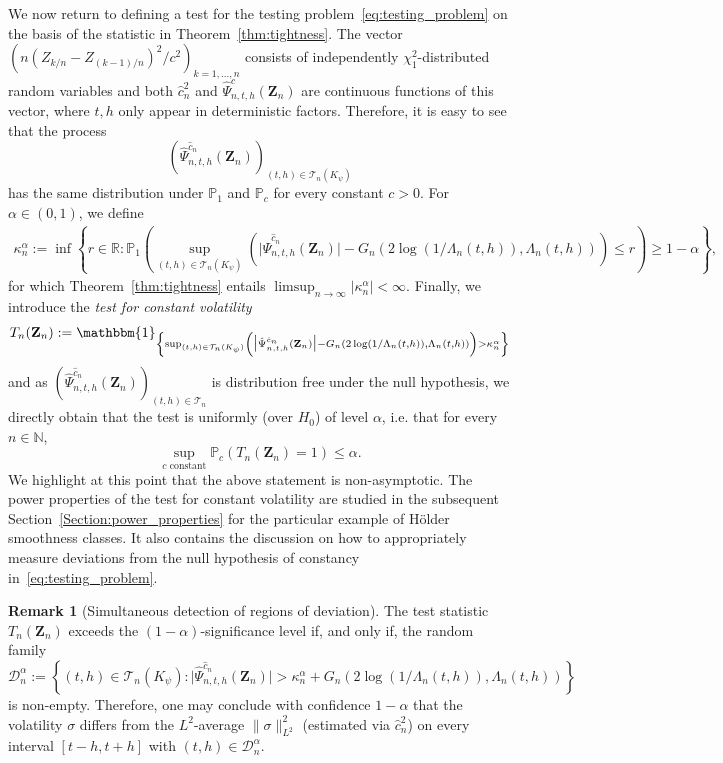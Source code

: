 \documentclass[10.5pt,letter]{article}
\numberwithin{equation}{section}
\theoremstyle{definition}
\newtheorem{remark}[theorem]{Remark}
\newcommand{\R}{\mathbb{R}}
\newcommand{\N}{\mathbb{N}}
\renewcommand{\P}{\mathbb{P}}
\newcommand{\1}{\mathbbm{1}}
\begin{document}
We now return to defining a test for the testing problem~\eqref{eq:testing_problem} on the basis of the statistic in Theorem~\ref{thm:tightness}. The vector $(n(Z_{k/n}-Z_{(k-1)/n})^2/c^2)_{k=1,\dots, n}$ consists of independently $\chi_1^2$-distributed random variables and both $\hat{c}_n^2$ and $\hat{\Psi}_{n,t,h}^{c}(\mathbf{Z}_n)$ are continuous functions of this vector, where $t,h$ only appear in deterministic factors. Therefore, it is easy to see that the process
\[ \left( \hat{\Psi}_{n,t,h}^{\hat{c}_n}(\mathbf{Z}_n)\right)_{(t,h)\in\mathcal{T}_n(K_\psi)}\]
has the same distribution under $\P_1$ and $\P_c$ for every constant $c>0$. For $\alpha\in (0,1)$, we define
\begin{align*}
    \kappa_n^\alpha := \inf\left\{ r\in\R: \P_1\left( \sup_{(t,h)\in\mathcal{T}_n(K_\psi)}\left( \big|\hat{\Psi}_{n,t,h}^{\hat{c}_n}(\mathbf{Z}_n)\big| - G_n\left(2\log(1/\Lambda_n(t,h)), \Lambda_n(t,h)\right)\right) \leq r\right)\geq 1-\alpha \right\},
\end{align*}
for which Theorem~\ref{thm:tightness} entails $\limsup_{n\to\infty}|\kappa_n^\alpha|<\infty$. Finally, we introduce the \textit{test for constant volatility}
\begin{align}\label{eq:test}
    T_n(\mathbf{Z}_n) := \1_{\left\{\sup_{(t,h)\in\mathcal{T}_n(K_\psi)}\left( \big|\hat{\Psi}_{n,t,h}^{\hat{c}_n}(\mathbf{Z}_n)\big| - G_n\left(2\log(1/\Lambda_n(t,h)), \Lambda_n(t,h)\right)\right) >\kappa_n^\alpha\right\}}
\end{align}
and as $(\hat{\Psi}_{n,t,h}^{\hat{c}_n}(\mathbf{Z}_n))_{(t,h)\in\mathcal{T}_n}$ is distribution free under the null hypothesis, we directly obtain that the test is uniformly (over $H_0$) of level $\alpha$, i.e. that for every $n\in\N$,
\[ \sup_{c\textrm{ constant}}\P_c\left( T_n(\mathbf{Z}_n) =1\right) \leq \alpha.\]
We highlight at this point that the above statement is non-asymptotic. The power properties of the test for constant volatility are studied in the subsequent Section~\ref{Section:power_properties} for the particular example of Hölder smoothness classes. It also contains the discussion on how to appropriately measure deviations from the null hypothesis of constancy in~\eqref{eq:testing_problem}.


\begin{remark}[Simultaneous detection of regions of deviation]
The test statistic $T_n(\mathbf{Z}_n)$ exceeds the $(1-\alpha)$-significance level if, and only if, the random family
\[ \mathcal{D}_n^\alpha := \left\{ (t,h)\in\mathcal{T}_n(K_\psi): \big|\hat{\Psi}_{n,t,h}^{\hat{c}_n}(\mathbf{Z}_n)\big| > \kappa_n^\alpha + G_n\left( 2\log(1/\Lambda_n(t,h)), \Lambda_n(t,h)\right)\right\}\]
is non-empty. Therefore, one may conclude with confidence $1-\alpha$ that the volatility $\sigma$ differs from the $L^2$-average $\|\sigma\|_{L^2}^2$ (estimated via $\hat{c}_n^2$) on every interval $[t-h,t+h]$ with $(t,h)\in\mathcal{D}_n^\alpha$.
\end{remark}
\end{document}
